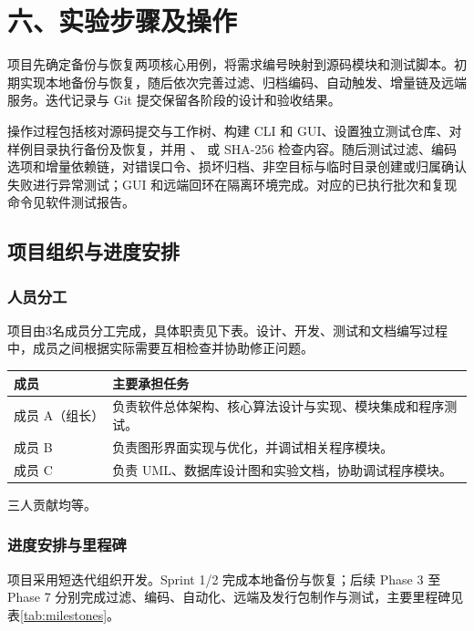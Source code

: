 \section*{六、实验步骤及操作}
项目先确定备份与恢复两项核心用例，将需求编号映射到源码模块和测试脚本。初期实现本地备份与恢复，随后依次完善过滤、归档编码、自动触发、增量链及远端服务。迭代记录与 Git 提交保留各阶段的设计和验收结果。

操作过程包括核对源码提交与工作树、构建 CLI 和 GUI、设置独立测试仓库、对样例目录执行备份及恢复，并用 、 或 SHA-256 检查内容。随后测试过滤、编码选项和增量依赖链，对错误口令、损坏归档、非空目标与临时目录创建或归属确认失败进行异常测试；GUI 和远端回环在隔离环境完成。对应的已执行批次和复现命令见软件测试报告。

\subsection*{项目组织与进度安排}
\subsubsection*{人员分工}
项目由3名成员分工完成，具体职责见下表。设计、开发、测试和文档编写过程中，成员之间根据实际需要互相检查并协助修正问题。

\begin{center}
\begin{tabularx}{\linewidth}{@{}lX@{}}
\toprule
成员 & 主要承担任务 \\
\midrule
成员 A（组长） & 负责软件总体架构、核心算法设计与实现、模块集成和程序测试。 \\
成员 B & 负责图形界面实现与优化，并调试相关程序模块。 \\
成员 C & 负责 UML、数据库设计图和实验文档，协助调试程序模块。 \\
\bottomrule
\end{tabularx}
\end{center}
三人贡献均等。

\subsubsection*{进度安排与里程碑}
项目采用短迭代组织开发。Sprint 1/2 完成本地备份与恢复；后续 Phase 3 至 Phase 7 分别完成过滤、编码、自动化、远端及发行包制作与测试，主要里程碑见表\ref{tab:milestones}。


